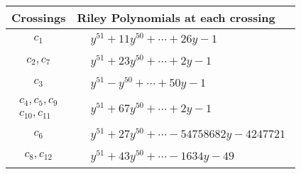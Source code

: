 \documentclass[1p]{elsarticle_modified}
\theoremstyle{definition}
\begin{document}
\begin{tabular}{m{50pt}|m{274pt}}
Crossings & \hspace{64pt}Riley Polynomials at each crossing \\
\hline $$\begin{aligned}c_{1}\end{aligned}$$&$\begin{aligned}
&y^{51}+11 y^{50}+\cdots+26 y-1
\end{aligned}$\\
\hline $$\begin{aligned}c_{2},c_{7}\end{aligned}$$&$\begin{aligned}
&y^{51}+23 y^{50}+\cdots+2 y-1
\end{aligned}$\\
\hline $$\begin{aligned}c_{3}\end{aligned}$$&$\begin{aligned}
&y^{51}- y^{50}+\cdots+50 y-1
\end{aligned}$\\
\hline $$\begin{aligned}c_{4},c_{5},c_{9}\\c_{10},c_{11}\end{aligned}$$&$\begin{aligned}
&y^{51}+67 y^{50}+\cdots+2 y-1
\end{aligned}$\\
\hline $$\begin{aligned}c_{6}\end{aligned}$$&$\begin{aligned}
&y^{51}+27 y^{50}+\cdots-54758682 y-4247721
\end{aligned}$\\
\hline $$\begin{aligned}c_{8},c_{12}\end{aligned}$$&$\begin{aligned}
&y^{51}+43 y^{50}+\cdots-1634 y-49
\end{aligned}$\\
\hline
\end{tabular}
\vskip 2pc
\end{document}
